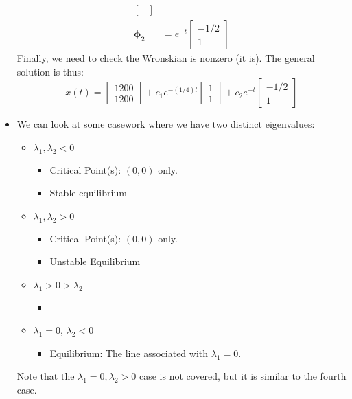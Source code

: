 \begin{itemize}
\begin{example}
\begin{align}
\begin{bmatrix}
                  \end{bmatrix} \\ 
                  \bm{\phi_2} &= e^{-t}\begin{bmatrix}
                      -1/2 \\ 1
                  \end{bmatrix}
              \end{align}
              Finally, we need to check the Wronskian is nonzero (it is). The general solution is thus: 
              \begin{equation}
                  x(t) = \begin{bmatrix}
                      1200 \\ 1200
                  \end{bmatrix} + c_1e^{-(1/4)t}\begin{bmatrix}
                      1\\ 1
                  \end{bmatrix} + c_2e^{-t}\begin{bmatrix}
                      -1/2 \\ 1
                  \end{bmatrix}
              \end{equation} 
          \end{example}
          \item We can look at some casework where we have two distinct eigenvalues: 
          \begin{itemize}
              \item $\lambda_1,\lambda_2 < 0$
              \begin{itemize}
                  \item Critical Point(s): $(0,0)$ only.
                  \item Stable equilibrium 
              \end{itemize}
              \item $\lambda_1,\lambda_2 > 0$
              \begin{itemize}
                  \item Critical Point(s): $(0,0)$ only.
                  \item Unstable Equilibrium
              \end{itemize}
              \item $\lambda_1 > 0 > \lambda_2$
              \begin{itemize}
                  \item 
              \end{itemize}
              \item $\lambda_1 = 0$, $\lambda_2 < 0$
              \begin{itemize}
                  \item Equilibrium: The line associated with $\lambda_1=0.$
              \end{itemize}
          \end{itemize}
          Note that the $\lambda_1 =0, \lambda_2>0$ case is not covered, but it is similar to the fourth case.
\end{itemize}